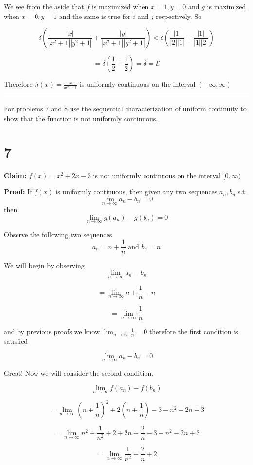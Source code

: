 \documentclass[10pt,letterpaper]{article}
\newcommand\E{\mathcal{E}}
\newcommand\ds{\displaystyle}
\newcommand\qedsym{\hfill \rule{2mm}{2mm}}
\begin{document}
We see from the aside that $f$ is maximized when $x=1, y=0$ and $g$ is maximized when $x=0,y=1$ and the same is true for $i$ and $j$ respectively. So

\[\delta\left(\frac{|x|}{|x^2+1||y^2+1|}+\frac{|y|}{|x^2+1||y^2+1|}\right) < \delta\left(\frac{|1|}{|2||1|}+\frac{|1|}{|1||2|}\right)\]

\[=\delta\left(\frac{1}{2} + \frac{1}{2}\right) = \delta = \E\]

Therefore $h(x) = \frac{x}{x^2+1}$ is uniformly continuous on the interval $(-\infty, \infty)$

\qedsym

\bigskip

For problems 7 and 8 use the sequential characterization of uniform continuity to show that the function is not uniformly continuous.

\section*{7}

\textbf{Claim:} $f(x) = x^2+2x-3$ is not uniformly continuous on the interval $[0, \infty)$

\medskip

\textbf{Proof:} If $f(x)$ is uniformly continuous, then given any two sequences $a_n, b_n$ s.t. \[\ds\lim_{n\to\infty}a_n-b_n = 0\] then \[\ds\lim_{n\to\infty}g(a_n)-g(b_n) = 0\]

Observe the following two sequences
\[a_n = n+\frac{1}{n} \text{ and } b_n = n\]

We will begin by observing \[\lim_{n\to\infty}a_n-b_n\]

\[= \lim_{n\to\infty}n + \frac{1}{n} - n\]

\[=\lim_{n\to\infty}\frac{1}{n}\]

and by previous proofs we know $\ds\lim_{n\to\infty}\frac{1}{n}=0$ therefore the first condition is satisfied

\[\ds\lim_{n\to\infty}a_n-b_n = 0\]

Great! Now we will consider the second condition.

\[\lim_{n\to\infty}f(a_n)-f(b_n)\]

\[=\lim_{n\to\infty}\left(n+\frac{1}{n}\right)^2 + 2\left(n+\frac{1}{n}\right) - 3 - n^2 - 2n + 3\]

\[=\lim_{n\to\infty}n^2+\frac{1}{n^2}+2 + 2n+\frac{2}{n} - 3 - n^2 - 2n + 3\]

\[=\lim_{n\to\infty}\frac{1}{n^2}+\frac{2}{n}+2\]
\end{document}
